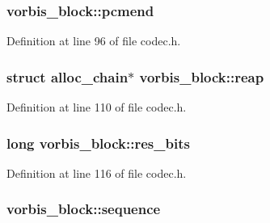 \subsubsection[{\texorpdfstring{pcmend}{pcmend}}]{ vorbis\+\_\+block\+::pcmend}\hypertarget{structvorbis__block_a946562a7fdb80cabf6ee749bdce1a0ed}{}\label{structvorbis__block_a946562a7fdb80cabf6ee749bdce1a0ed}


Definition at line 96 of file codec.\+h.

\subsubsection[{\texorpdfstring{reap}{reap}}]{\setlength{\rightskip}{0pt plus 5cm}struct {\bf alloc\+\_\+chain}$\ast$ vorbis\+\_\+block\+::reap}\hypertarget{structvorbis__block_a047afc2ab3e3936d86817ff45c0eecde}{}\label{structvorbis__block_a047afc2ab3e3936d86817ff45c0eecde}


Definition at line 110 of file codec.\+h.

\subsubsection[{\texorpdfstring{res\+\_\+bits}{res_bits}}]{\setlength{\rightskip}{0pt plus 5cm}long vorbis\+\_\+block\+::res\+\_\+bits}\hypertarget{structvorbis__block_a3c91d73c477db77f4b85ded0fdcb607c}{}\label{structvorbis__block_a3c91d73c477db77f4b85ded0fdcb607c}


Definition at line 116 of file codec.\+h.

\subsubsection[{\texorpdfstring{sequence}{sequence}}]{ vorbis\+\_\+block\+::sequence}\hypertarget{structvorbis__block_a09e48c70ae79cae2d37a4e0e55f294ef}{}\label{structvorbis__block_a09e48c70ae79cae2d37a4e0e55f294ef}


